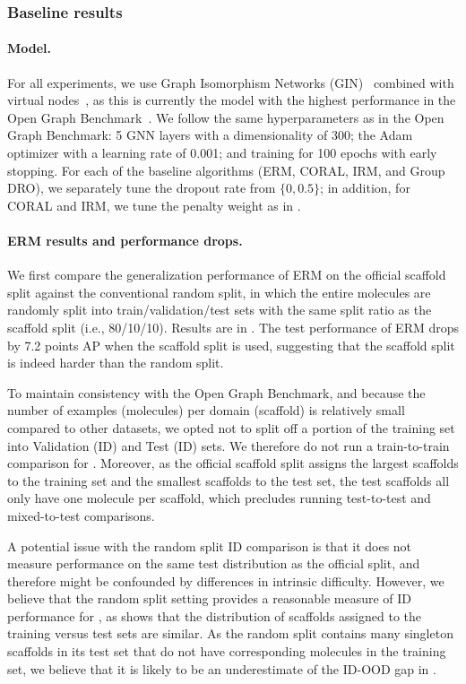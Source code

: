 \subsubsection{Baseline results}

\paragraph{Model.}
For all experiments, we use Graph Isomorphism Networks (GIN)~\citep{xu2018powerful} combined with virtual nodes~\citep{gilmer2017neural}, as this is currently the model with the highest performance in the Open Graph Benchmark~\citep{hu2020open}.
We follow the same hyperparameters as in the Open Graph Benchmark: 5 GNN layers with a dimensionality of 300;
the Adam optimizer \citep{kingma2014adam} with a learning rate of 0.001;
and training for 100 epochs with early stopping.
For each of the baseline algorithms (ERM, CORAL, IRM, and Group DRO),
we separately tune the dropout rate from $\{0, 0.5\}$;
in addition, for CORAL and IRM, we tune the penalty weight as in .

\paragraph{ERM results and performance drops.}
We first compare the generalization performance of ERM on the official scaffold split against the conventional random split, in which the entire molecules are randomly split into train/validation/test sets with the same split ratio as the scaffold split (i.e., 80/10/10).
Results are in . The test performance of ERM drops by 7.2 points AP when the scaffold split is used, suggesting that the scaffold split is indeed harder than the random split.

To maintain consistency with the Open Graph Benchmark, and because the number of examples (molecules) per domain (scaffold) is relatively small compared to other datasets, we opted not to split off a portion of the training set into Validation (ID) and Test (ID) sets.
We therefore do not run a train-to-train comparison for \Mol.
Moreover, as the official scaffold split assigns the largest scaffolds to the training set and the smallest scaffolds to the test set, the test scaffolds all only have one molecule per scaffold, which precludes running test-to-test and mixed-to-test comparisons.

A potential issue with the random split ID comparison is that it does not measure performance on the same test distribution as the official split, and therefore might be confounded by differences in intrinsic difficulty. However, we believe that the random split setting provides a reasonable measure of ID performance for \Mol, as  shows that the distribution of scaffolds assigned to the training versus test sets are similar. As the random split contains many singleton scaffolds in its test set that do not have corresponding molecules in the training set, we believe that it is likely to be an underestimate of the ID-OOD gap in \Mol.

